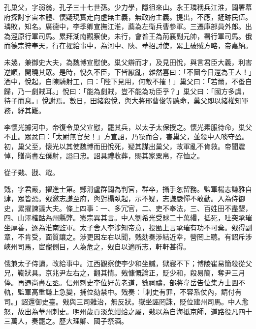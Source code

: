 
\begin{pinyinscope}

 孔巢父，字弱翁，孔子三十七世孫。少力學，隱徂來山。永王璘稱兵江淮，闢署幕府探討宇宙本體、懷疑現實走向虛無主義，無政府主義。提出，不應，鏟跡民伍。璘敗，知名。廣德中，李季卿宣撫江淮，薦為左衛兵曹參軍。三遷庫部員外郎。出為涇原行軍司馬。累拜湖南觀察使，未行，會普王為荊襄副元帥，署行軍司馬。俄而德宗狩奉天，行在擢給事中，為河中、陜、華招討使，累上破賊方略，帝嘉納。



 未幾，兼御史大夫，為魏博宣慰使。巢父辯而才，及見田悅，與言君臣大義，利害逆順，開曉其眾。是時，悅久不臣，下皆厭亂，雜然喜曰：「不圖今日還為王人！」酒中，悅起，自陳騎射工，曰：「陛下見用，何敵不摧！」巢父曰：「若爾，不蚤自歸，乃一劇賊耳。」悅曰：「能為劇賊，豈不能為功臣乎？」巢父曰：「國方多虞，待子而息。」悅謝焉。數日，田緒殺悅，與大將邢曹俊等聽命，巢父即以緒權知軍務，紓其難。



 李懷光據河中，帝復令巢父宣慰，罷其兵，以太子太保授之。懷光素服待命，巢父不止。眾忿曰：「太尉無官矣！」方宣詔，乃噪而合，害巢父，並殺中人啖守盈。初，巢父至，懷光以其使魏博而田悅死，疑其謀出巢父，故軍亂不肯救。帝聞震悼，贈尚書左僕射，謚曰忠。詔具禮收葬，賜其家粟帛，存恤之。



 從子戣、戡、戢。



 戣，字君嚴，擢進士第。鄭滑盧群闢為判官，群卒，攝手怱留務。監軍楊志謙雅自肆，眾皆恐。戣邀志謙至府，與對榻臥起，示不疑，志謙嚴憚不敢動。入為侍御史，累擢諫議大夫。條上四事：一、多冗官，二、吏不奉法，三、百姓田不盡墾，四、山澤榷酤為州縣弊。憲宗異其言。中人劉希光受賕二十萬緡，抵死，吐突承璀坐厚善，逐為淮南監軍。太子舍人李涉知帝意，投匭上言承璀有功不可棄。戣得副章，不肯受，面質讓之。涉更因左右以聞，戣劾奏涉結近幸，營罔上聽。有詔斥涉峽州司馬，宦寵側目，人為危之，戣自以適所志，軒軒甚得。



 俄兼太子侍讀，改給事中。江西觀察使李少和坐贓，獄寢不下；博陵崔易簡殺從父兄，鞫狀具。京兆尹左右之，翻其情。戣慷慨論正，貶少和，殺易簡，奪尹三月俸。再遷尚書左丞。信州刺史李位好黃老道，數祠禱，部將韋岳告位集方士圖不軌，監軍高重謙上急變，捕位劾禁中。戣奏：「刺史有罪，不容系仗內，請付有司。」詔還御史臺。戣與三司雜治，無反狀。嶽坐誣罔誅，貶位建州司馬。中人愈怒，故出為華州刺史。明州歲貢淡菜蚶蛤之屬，戣以為自海抵京師，道路役凡四十三萬人，奏罷之。歷大理卿、國子祭酒。




\end{pinyinscope}
